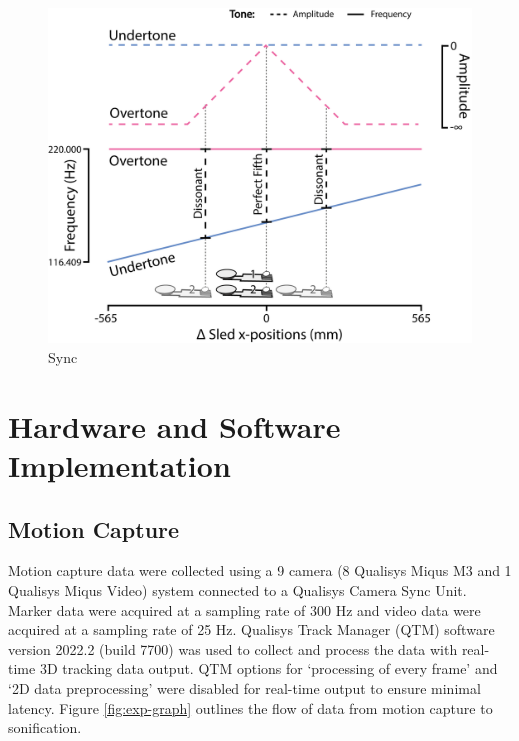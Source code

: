 \documentclass[10pt,a4paper,onecolumn]{article}
\begin{document}
\begin{figure}[h]

{\centering \includegraphics[width=1\linewidth]{figures/sync_sonif_illustration} 

}

\caption{Sync}\label{fig:sync-illustration}
\end{figure}

\hypertarget{hardware-and-software-implementation}{%
\section{Hardware and Software Implementation}\label{hardware-and-software-implementation}}

\hypertarget{motion-capture}{%
\subsection{Motion Capture}\label{motion-capture}}

Motion capture data were collected using a 9 camera (8 Qualisys Miqus M3 and 1 Qualisys Miqus Video) system connected to a Qualisys Camera Sync Unit. Marker data were acquired at a sampling rate of 300 Hz and video data were acquired at a sampling rate of 25 Hz. Qualisys Track Manager (QTM) software version 2022.2 (build 7700) was used to collect and process the data with real-time 3D tracking data output. QTM options for `processing of every frame' and `2D data preprocessing' were disabled for real-time output to ensure minimal latency. Figure \ref{fig:exp-graph} outlines the flow of data from motion capture to sonification.
\end{document}
